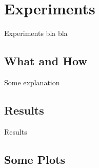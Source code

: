\chapter{Experiments}
Experiments bla bla
\section{What and How}
Some explanation
\section{Results}
Results
\section{Some Plots}